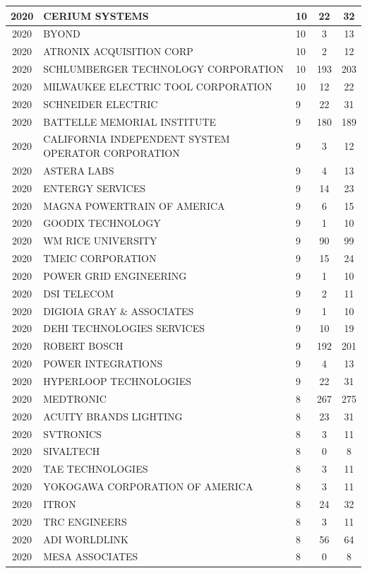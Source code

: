 \documentclass{article}%
\begin{document}
\begin{longtable}{c|p{20em}|p{5em}|c|c}
\hline%
2020&CERIUM SYSTEMS&10&22&32\\%
\hline%
2020&BYOND&10&3&13\\%
\hline%
2020&ATRONIX ACQUISITION CORP&10&2&12\\%
\hline%
2020&SCHLUMBERGER TECHNOLOGY CORPORATION&10&193&203\\%
\hline%
2020&MILWAUKEE ELECTRIC TOOL CORPORATION&10&12&22\\%
\hline%
2020&SCHNEIDER ELECTRIC&9&22&31\\%
\hline%
2020&BATTELLE MEMORIAL INSTITUTE&9&180&189\\%
\hline%
2020&CALIFORNIA INDEPENDENT SYSTEM OPERATOR CORPORATION&9&3&12\\%
\hline%
2020&ASTERA LABS&9&4&13\\%
\hline%
2020&ENTERGY SERVICES&9&14&23\\%
\hline%
2020&MAGNA POWERTRAIN OF AMERICA&9&6&15\\%
\hline%
2020&GOODIX TECHNOLOGY&9&1&10\\%
\hline%
2020&WM RICE UNIVERSITY&9&90&99\\%
\hline%
2020&TMEIC CORPORATION&9&15&24\\%
\hline%
2020&POWER GRID ENGINEERING&9&1&10\\%
\hline%
2020&DSI TELECOM&9&2&11\\%
\hline%
2020&DIGIOIA GRAY \& ASSOCIATES&9&1&10\\%
\hline%
2020&DEHI TECHNOLOGIES SERVICES&9&10&19\\%
\hline%
2020&ROBERT BOSCH&9&192&201\\%
\hline%
2020&POWER INTEGRATIONS&9&4&13\\%
\hline%
2020&HYPERLOOP TECHNOLOGIES&9&22&31\\%
\hline%
2020&MEDTRONIC&8&267&275\\%
\hline%
2020&ACUITY BRANDS LIGHTING&8&23&31\\%
\hline%
2020&SVTRONICS&8&3&11\\%
\hline%
2020&SIVALTECH&8&0&8\\%
\hline%
2020&TAE TECHNOLOGIES&8&3&11\\%
\hline%
2020&YOKOGAWA CORPORATION OF AMERICA&8&3&11\\%
\hline%
2020&ITRON&8&24&32\\%
\hline%
2020&TRC ENGINEERS&8&3&11\\%
\hline%
2020&ADI WORLDLINK&8&56&64\\%
\hline%
2020&MESA ASSOCIATES&8&0&8\\%

\end{longtable}
\end{document}
